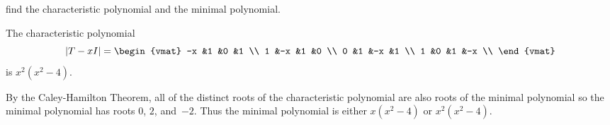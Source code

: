 \begin{exercises}
\begin{equation*}
    \end{equation*}
    find the characteristic polynomial and the minimal polynomial.
    \begin{answer}
    The characteristic polynomial
    \begin{equation*}
      \deter{T-xI}=
      \begin{vmat}
        -x &1  &0  &1 \\
         1 &-x &1  &0 \\
         0 &1  &-x &1 \\
         1 &0  &1  &-x \\
      \end{vmat}
    \end{equation*}
    is $x^2(x^2-4)$.

    By the Caley-Hamilton Theorem, all of the distinct roots of the 
    characteristic polynomial are also roots of the minimal polynomial so 
    the minimal polynomial has roots $0$, $2$, and~$-2$.
    Thus the minimal polynomial is either $x(x^2-4)$ or $x^2(x^2-4)$.
    

\end{answer}
\end{exercises}
